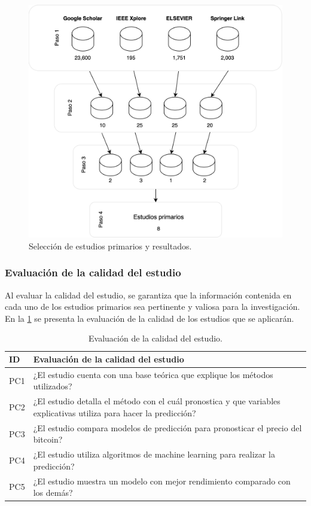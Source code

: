 \begin{figure}[!h]
	\centering
	\includegraphics[width=0.7\linewidth]{Chapter2/SelecEstudiPrim_1.png}
	\caption{Selección de estudios primarios y resultados.}
	\label{fig1}
\end{figure}

\vspace{-0.5cm}

\subsubsection{Evaluación de la calidad del estudio}
Al evaluar la calidad del estudio, se garantiza que la información contenida en cada uno de los estudios primarios sea pertinente y valiosa para la investigación. En la \cref{tab:Table2} se presenta la evaluación de la calidad de los estudios que se aplicarán.

\begin{table}[!h]
	\centering
	\begin{tabular}{ | m{2cm}| m{12cm} | }
		\hline
		\textbf{ID} & \textbf{Evaluación de la calidad del estudio}\\
		\hline
		PC1 & ¿El estudio cuenta con una base teórica que explique los métodos utilizados?\\
		\hline
		PC2 & ¿El estudio detalla el método con el cuál pronostica y que variables explicativas utiliza para hacer la predicción?\\
		\hline
		PC3 & ¿El estudio compara modelos de predicción para pronosticar el precio del bitcoin?\\
		\hline
		PC4 & ¿El estudio utiliza algoritmos de machine learning para realizar la predicción?\\
		\hline
		PC5 & ¿El estudio muestra un modelo con mejor rendimiento comparado con los demás?\\
		\hline
	\end{tabular}
	\caption{Evaluación de la calidad del estudio.}
	\label{tab:Table2}
\end{table}

